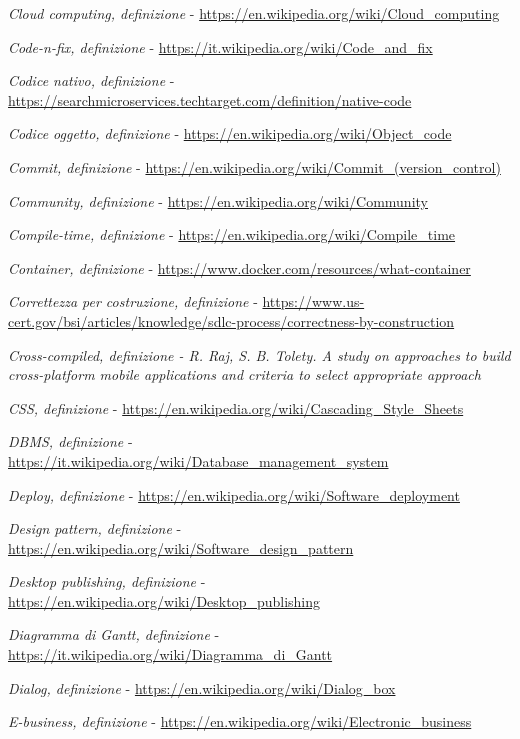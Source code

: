 \begin{enumerate}[label={[\arabic*]}]
	\item \textit{Cloud computing, definizione} - \url{https://en.wikipedia.org/wiki/Cloud_computing}
	\item \textit{Code-n-ﬁx, definizione} - \url{https://it.wikipedia.org/wiki/Code_and_fix}
	\item \textit{Codice nativo, definizione} - \url{https://searchmicroservices.techtarget.com/definition/native-code}
	\item \textit{Codice oggetto, definizione} - \url{https://en.wikipedia.org/wiki/Object_code}
	\item \textit{Commit, definizione} - \url{https://en.wikipedia.org/wiki/Commit_(version_control)}
	\item \textit{Community, definizione} - \url{https://en.wikipedia.org/wiki/Community}
	\item \textit{Compile-time, definizione} - \url{https://en.wikipedia.org/wiki/Compile_time}
	\item \textit{Container, definizione} - \url{https://www.docker.com/resources/what-container}
	\item \textit{Correttezza per costruzione, definizione} - \url{https://www.us-cert.gov/bsi/articles/knowledge/sdlc-process/correctness-by-construction}
	\item \textit{Cross-compiled, definizione - R. Raj, S. B. Tolety. A study on approaches to build cross-platform mobile applications and criteria to select appropriate approach}
	\item \textit{CSS, definizione} - \url{https://en.wikipedia.org/wiki/Cascading_Style_Sheets}
	\item \textit{DBMS, definizione} - \url{https://it.wikipedia.org/wiki/Database_management_system}
	\item \textit{Deploy, definizione} - \url{https://en.wikipedia.org/wiki/Software_deployment}
	\item \textit{Design pattern, definizione} - \url{https://en.wikipedia.org/wiki/Software_design_pattern}
	\item \textit{Desktop publishing, definizione} - \url{https://en.wikipedia.org/wiki/Desktop_publishing}
	\item \textit{Diagramma di Gantt, definizione} - \url{https://it.wikipedia.org/wiki/Diagramma_di_Gantt}
	\item \textit{Dialog, definizione} - \url{https://en.wikipedia.org/wiki/Dialog_box}
	\item \textit{E-business, definizione} - \url{https://en.wikipedia.org/wiki/Electronic_business}

\end{enumerate}
